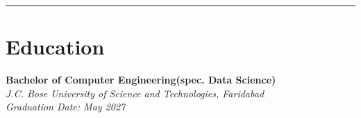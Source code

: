 \documentclass[a4paper,10pt]{article}
\begin{document}
\hrule
\vspace{5pt}

\section*{Education}
\vspace{-10pt}
\textbf{Bachelor of Computer Engineering(spec. Data Science)} \hfill \\ 
\textit{J.C. Bose University of Science and Technologies, Faridabad}\\
\textit{Graduation Date: May 2027}
\end{document}
